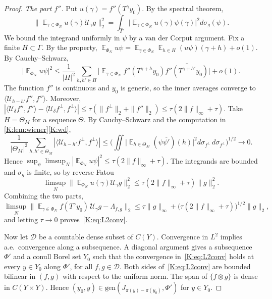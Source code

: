 \begin{proof}
\emph{The part $f''$.}
Put $u(\gamma)=f''(T^\gamma y_0)$. By the spectral theorem,
\[
\Big\|\mathop{\mathbb E}_{\gamma\in\Phi_N}u(\gamma)\mathcal U_\gamma g\Big\|_2^2=\int_{\widehat\Gamma}\Big|\mathop{\mathbb E}_{\gamma\in\Phi_N}u(\gamma)\psi(\gamma)\Big|^2d\sigma_g(\psi).
\]
We bound the integrand uniformly in $\psi$ by a van der Corput argument.
Fix a finite $H\subset\Gamma$. By the \Fol{} property,
$\mathop{\mathbb E}_{\Phi_N}u\psi=\mathop{\mathbb E}_{\gamma\in\Phi_N}\mathop{\mathbb E}_{h\in H}(u\psi)(\gamma+h)+o(1)$.
By Cauchy--Schwarz,
\[
\Big|\mathop{\mathbb E}_{\Phi_N}u\psi\Big|^2\le\frac1{|H|^2}\sum_{h,h'\in H}\Big|\mathop{\mathbb E}_{\gamma\in\Phi_N}f''(T^{\gamma+h}y_0)\overline{f''(T^{\gamma+h'}y_0)}\Big|+o(1).
\]
The function $f''$ is continuous and $y_0$ is generic, so the inner averages converge to
$\langle\mathcal U_{h-h'}f'',f''\rangle$.
Moreover,
$|\langle\mathcal U_\delta f'',f''\rangle-\langle\mathcal U_\delta f^\perp,f^\perp\rangle|\le\tau(\|f^\perp\|_2+\|f''\|_2)\le\tau(2\|f\|_\infty+\tau)$.
Take $H=\Theta_M$ for a \Fol{} sequence $\Theta$. By Cauchy--Schwarz and the computation
in \cref{K:lem:wiener}\ref{K:wd},
\[
\frac1{|\Theta_M|^2}\sum_{h,h'\in\Theta_M}|\langle\mathcal U_{h-h'}f^\perp,f^\perp\rangle|\le\Big(\iint\Big|\mathop{\mathbb E}_{h\in\Theta_M}(\psi\overline{\psi'})(h)\Big|^2d\sigma_{f^\perp}\,d\sigma_{f^\perp}\Big)^{1/2}\to0 .
\]
Hence $\sup_\psi\limsup_N|\mathop{\mathbb E}_{\Phi_N}u\psi|^2\le\tau(2\|f\|_\infty+\tau)$.
The integrands are bounded and $\sigma_g$ is finite, so by reverse Fatou
\[
\limsup_N\Big\|\mathop{\mathbb E}_{\Phi_N}u(\gamma)\mathcal U_\gamma g\Big\|_2^2\le\tau(2\|f\|_\infty+\tau)\|g\|_2^2 .
\]
Combining the two parts,
\[
\limsup_N\Big\|\mathop{\mathbb E}_{\gamma\in\Phi_N}f(T^\gamma y_0)\,\mathcal U_\gamma g-\Lambda_{f,g}\Big\|_2
\le\tau\|g\|_\infty+\big(\tau(2\|f\|_\infty+\tau)\big)^{1/2}\|g\|_2 ,
\]
and letting $\tau\to0$ proves~\eqref{K:eq:L2conv}.

Now let $\mathcal D$ be a countable dense subset of $C(Y)$.
Convergence in $L^2$ implies a.e.\ convergence along a subsequence. A diagonal argument
gives a subsequence $\Phi'$ and a conull Borel set $Y_0$ such that the convergence
in~\eqref{K:eq:L2conv} holds at every $y\in Y_0$ along $\Phi'$, for all $f,g\in\mathcal D$.
Both sides of~\eqref{K:eq:L2conv} are bounded bilinear in $(f,g)$ with respect to the
uniform norm. The span of $\{f\otimes g\}$ is dense in $C(Y\times Y)$.
Hence $(y_0,y)\in\mathrm{gen}(J_{\pi(y)-\pi(y_0)},\Phi')$ for $y\in Y_0$.
\end{proof}


